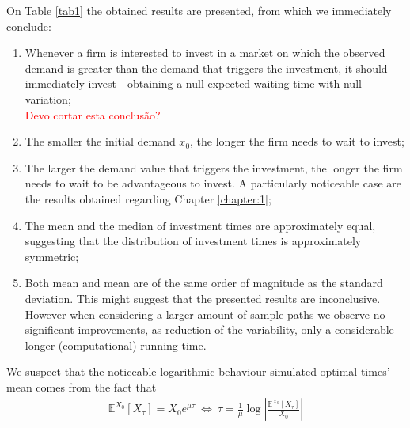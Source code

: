 On Table \ref{tab1}
the obtained results are presented, from which we immediately conclude:
\begin{enumerate}
	\item %
	Whenever a firm is interested to invest in a market on which the observed demand is greater than the demand that triggers the investment, it should immediately invest - obtaining a null expected waiting time with null variation;
	\\ \textcolor{red}{Devo cortar esta conclusão?}
	\item The smaller the initial demand $x_0$, the longer the firm needs to wait to invest;
	\item The larger the demand value that triggers the investment, the longer the firm needs to wait to be advantageous to invest. A particularly noticeable case are the results obtained regarding Chapter \ref{chapter:1};
	\item The mean and the median of investment times are approximately equal, suggesting that the distribution of investment times is approximately symmetric;
	\item Both mean and mean are of the same order of magnitude as the standard deviation. This might suggest that the presented results are inconclusive. However when considering a larger amount of sample paths we observe no significant improvements, as reduction of the variability, only a considerable longer (computational) running time.
\end{enumerate}






We suspect that the noticeable logarithmic behaviour simulated optimal times' mean comes from the fact that
\begin{align*}
\mathds{E}^{X_0}[X_\tau]=X_0 e^{\mu \tau} \ \Leftrightarrow \ \tau= \frac{1}{\mu} \log \left|  \frac{\mathds{E}^{X_0}[X_\tau]}{X_0} \right|
\end{align*}


